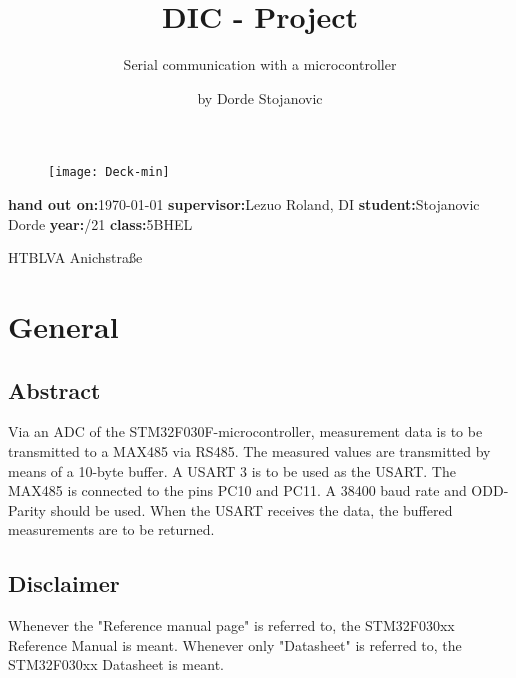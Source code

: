 \documentclass[11pt]{scrartcl}
\title{DIC - Project}
\subtitle{Serial communication with a microcontroller}
\author{by Dorde Stojanovic}
\date{ }
\begin{document}
	\maketitle

	\begin{figure}[h]
		\centering
		\texttt{[image: Deck-min]}
	\end{figure}		

	\begin{flushleft}
	\textbf{hand out on:}\dotfill \today
	\linebreak
	\textbf{supervisor:}\dotfill Lezuo Roland, DI
	\linebreak
	\textbf{student:}\dotfill Stojanovic Dorde
	\linebreak
	\textbf{year:}/21
	\linebreak
	\textbf{class:}\dotfill 5BHEL
	\linebreak

	\vspace*{1.5cm}
	\end{flushleft}
	
	\begin{center}
	\large{\hrulefill HTBLVA Anichstraße \hrulefill}
	\end{center}
	\newpage
	
	\tableofcontents
	\newpage
	
	\section{General}
	\subsection{Abstract}
Via an ADC of the STM32F030F-microcontroller, measurement data is to be transmitted to a MAX485 via RS485.
The measured values are transmitted by means of a 10-byte buffer.
A USART 3 is to be used as the USART.
The MAX485 is connected to the pins PC10 and PC11.
A 38400 baud rate and ODD-Parity should be used.
When the USART receives the data, the buffered measurements are to be returned.
	\subsection{Disclaimer}
Whenever the "Reference manual page" is referred to, the STM32F030xx Reference Manual is meant.
\newline\newline
Whenever only "Datasheet" is referred to, the STM32F030xx Datasheet is meant.
	
\end{document}
